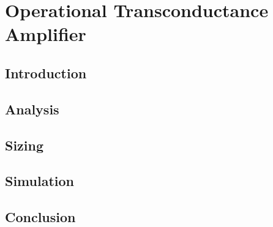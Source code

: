 \documentclass[../main.tex]{subfiles}
\begin{document}
\section{Operational Transconductance Amplifier}

\subsection{Introduction}

\subsection{Analysis}

\subsection{Sizing}

\subsection{Simulation}

\subsection{Conclusion}
\end{document}
